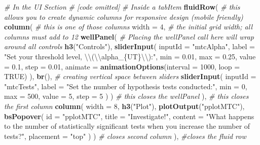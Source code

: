 \documentclass[
]{book}
\newenvironment{Shaded}{\begin{snugshade}}{\end{snugshade}}
\newcommand{\CharTok}[1]{\textcolor[rgb]{0.31,0.60,0.02}{#1}}
\newcommand{\CommentTok}[1]{\textcolor[rgb]{0.56,0.35,0.01}{\textit{#1}}}
\newcommand{\DataTypeTok}[1]{\textcolor[rgb]{0.13,0.29,0.53}{#1}}
\newcommand{\DecValTok}[1]{\textcolor[rgb]{0.00,0.00,0.81}{#1}}
\newcommand{\FloatTok}[1]{\textcolor[rgb]{0.00,0.00,0.81}{#1}}
\newcommand{\KeywordTok}[1]{\textcolor[rgb]{0.13,0.29,0.53}{\textbf{#1}}}
\newcommand{\NormalTok}[1]{#1}
\newcommand{\OtherTok}[1]{\textcolor[rgb]{0.56,0.35,0.01}{#1}}
\newcommand{\StringTok}[1]{\textcolor[rgb]{0.31,0.60,0.02}{#1}}
\begin{document}
\begin{Shaded}
\begin{Highlighting}[]
\CommentTok{# In the UI Section}
\CommentTok{# [code omitted]}
\CommentTok{# Inside a tabItem}
\KeywordTok{fluidRow}\NormalTok{( }\CommentTok{# this allows you to create dynamic columns for responsive design (mobile friendly)}
  \KeywordTok{column}\NormalTok{( }\CommentTok{# this is one of those columns}
    \DataTypeTok{width =} \DecValTok{4}\NormalTok{, }\CommentTok{# the initial grid width; all columns must add to 12}
    \KeywordTok{wellPanel}\NormalTok{( }\CommentTok{# Placing the wellPanel call here will wrap around all controls}
      \KeywordTok{h3}\NormalTok{(}\StringTok{"Controls"}\NormalTok{),}
      \KeywordTok{sliderInput}\NormalTok{(}
        \DataTypeTok{inputId =} \StringTok{"mtcAlpha"}\NormalTok{,}
        \DataTypeTok{label =} \StringTok{"Set your threshold level, }\CharTok{\textbackslash{}\textbackslash{}}\StringTok{(}\CharTok{\textbackslash{}\textbackslash{}}\StringTok{alpha_\{UT\}}\CharTok{\textbackslash{}\textbackslash{}}\StringTok{):"}\NormalTok{,}
        \DataTypeTok{min =} \FloatTok{0.01}\NormalTok{,}
        \DataTypeTok{max =} \FloatTok{0.25}\NormalTok{,}
        \DataTypeTok{value =} \FloatTok{0.1}\NormalTok{,}
        \DataTypeTok{step =} \FloatTok{0.01}\NormalTok{,}
        \DataTypeTok{animate =} \KeywordTok{animationOptions}\NormalTok{(}\DataTypeTok{interval =} \DecValTok{1000}\NormalTok{, }\DataTypeTok{loop =} \OtherTok{TRUE}\NormalTok{)}
\NormalTok{        ),}
      \KeywordTok{br}\NormalTok{(), }\CommentTok{# creating vertical space between sliders}
      \KeywordTok{sliderInput}\NormalTok{(}
        \DataTypeTok{inputId =} \StringTok{"mtcTests"}\NormalTok{,}
        \DataTypeTok{label =} \StringTok{"Set the number of hypothesis tests conducted:"}\NormalTok{,}
        \DataTypeTok{min =} \DecValTok{0}\NormalTok{,}
        \DataTypeTok{max =} \DecValTok{500}\NormalTok{,}
        \DataTypeTok{value =} \DecValTok{5}\NormalTok{,}
        \DataTypeTok{step =} \DecValTok{5}
\NormalTok{        )}
\NormalTok{      ) }\CommentTok{# this closes the wellPanel}
\NormalTok{    ), }\CommentTok{# this closes the first column}
  \KeywordTok{column}\NormalTok{(}
    \DataTypeTok{width =} \DecValTok{8}\NormalTok{,}
    \KeywordTok{h3}\NormalTok{(}\StringTok{"Plot"}\NormalTok{),}
    \KeywordTok{plotOutput}\NormalTok{(}\StringTok{"pplotMTC"}\NormalTok{),}
    \KeywordTok{bsPopover}\NormalTok{(}
      \DataTypeTok{id =} \StringTok{"pplotMTC"}\NormalTok{,}
      \DataTypeTok{title =} \StringTok{"Investigate!"}\NormalTok{,}
      \DataTypeTok{content =} \StringTok{"What happens to the number of statistically significant tests when you}
\StringTok{      increase the number of tests?"}\NormalTok{,}
      \DataTypeTok{placement =} \StringTok{"top"}
\NormalTok{      )}
\NormalTok{    ) }\CommentTok{# closes second column}
\NormalTok{  ), }\CommentTok{#closes the fluid row}
\end{Highlighting}
\end{Shaded}
\end{document}
